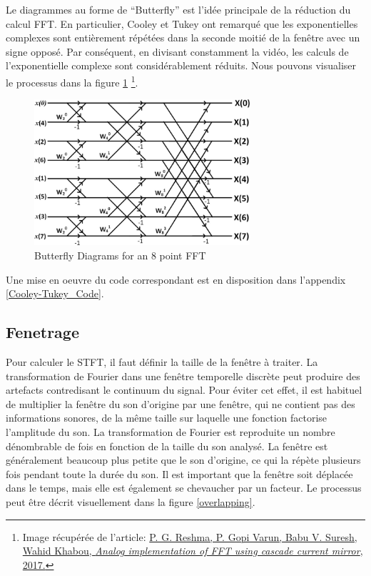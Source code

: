 Le diagrammes au forme de “Butterfly” est l'idée principale de la réduction du calcul FFT. En particulier, Cooley et Tukey ont remarqué que les exponentielles complexes sont entièrement répétées dans la seconde moitié de la fenêtre avec un signe opposé. Par conséquent, en divisant constamment la vidéo, les calculs de l’exponentielle complexe sont considérablement réduits. Nous pouvons visualiser le processus dans la figure \ref{Butterfly} \footnote{Image récupérée de l'article: \href{https://www.researchgate.net/figure/Radix-2-butterfly-diagram-for-8- point-FFT_fig1_312460770}{P. G. Reshma, P. Gopi Varun, Babu V. Suresh, Wahid Khabou, \textit {Analog implementation of FFT using cascade current mirror}, 2017.}}.

    \begin{figure}
        \centering
        \includegraphics[width = 8cm]{Graphs/Butterfly_8-point-FFT.png}
        \caption{Butterfly Diagrams for an 8 point FFT}
        \label{Butterfly}
    \end{figure}

Une mise en oeuvre du code correspondant est en disposition dans l'appendix \ref{Cooley-Tukey_Code}.

\subsection{Fenetrage}

Pour calculer le STFT, il faut définir la taille de la fenêtre à traiter. La transformation de Fourier dans une fenêtre temporelle discrète peut produire des artefacts contredisant le continuum du signal. Pour éviter cet effet, il est habituel de multiplier la fenêtre du son d'origine par une fenêtre, qui ne contient pas des informations sonores, de la même taille sur laquelle une fonction factorise l'amplitude du son. La transformation de Fourier est reproduite un nombre dénombrable de fois en fonction de la taille du son analysé. La fenêtre est généralement beaucoup plus petite que le son d'origine, ce qui la répète plusieurs fois pendant toute la durée du son. Il est important que la fenêtre soit déplacée dans le temps, mais elle est également se chevaucher par un facteur. Le processus peut être décrit visuellement dans la figure \ref{overlapping}.

